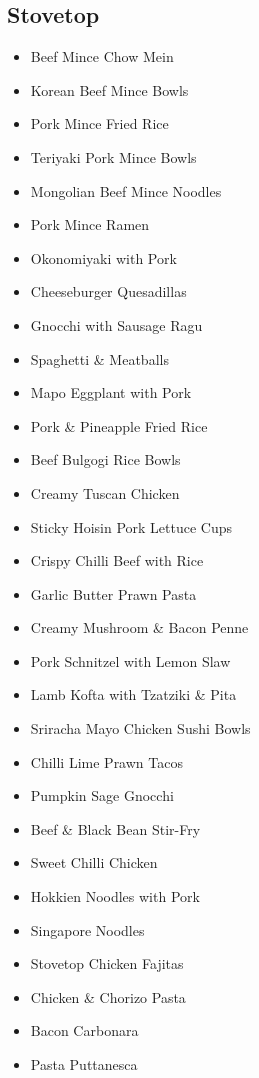 \subsection*{Stovetop}

\begin{itemize}
  \item \todo Beef Mince Chow Mein 
  \item \todo Korean Beef Mince Bowls
  \item \todo Pork Mince Fried Rice
  \item \todo Teriyaki Pork Mince Bowls
  \item \todo Mongolian Beef Mince Noodles
  \item \todo Pork Mince Ramen
  \item \todo Okonomiyaki with Pork 
  \item \todo Cheeseburger Quesadillas
  \item \todo Gnocchi with Sausage Ragu
  \item \todo Spaghetti \& Meatballs
  \item \todo Mapo Eggplant with Pork
  \item \todo Pork \& Pineapple Fried Rice
\end{itemize}

\begin{itemize}
  \item \todo Beef Bulgogi Rice Bowls 
  \item \todo Creamy Tuscan Chicken
  \item \todo Sticky Hoisin Pork Lettuce Cups
  \item \todo Crispy Chilli Beef with Rice
  \item \todo Garlic Butter Prawn Pasta
  \item \todo Creamy Mushroom \& Bacon Penne
  \item \todo Pork Schnitzel with Lemon Slaw
  \item \todo Lamb Kofta with Tzatziki \& Pita
  \item \todo Sriracha Mayo Chicken Sushi Bowls
  \item \todo Chilli Lime Prawn Tacos
  \item \todo Pumpkin Sage Gnocchi
  \item \todo Beef \& Black Bean Stir-Fry
  \item \todo Sweet Chilli Chicken
  \item \todo Hokkien Noodles with Pork
  \item \todo Singapore Noodles
  \item \todo Stovetop Chicken Fajitas
  \item \todo Chicken \& Chorizo Pasta
  \item \todo Bacon Carbonara
  \item \todo Pasta Puttanesca
\end{itemize}

